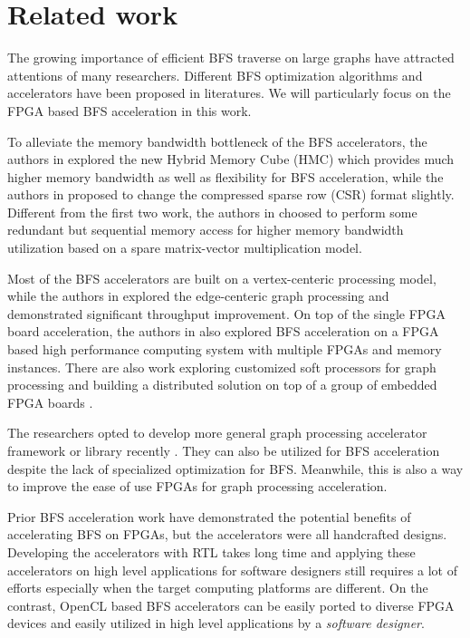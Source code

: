 \section{Related work} \label{sec:relatedwork}
The growing importance of efficient BFS traverse on large graphs 
have attracted attentions of many researchers. 
Different BFS optimization algorithms and accelerators 
have been proposed in literatures. We will 
particularly focus on the FPGA based BFS acceleration 
in this work. 

To alleviate the memory bandwidth bottleneck of the 
BFS accelerators, the authors in \cite{zhang2017boosting, khoram2018accelerating} 
explored the new Hybrid Memory Cube (HMC) which provides 
much higher memory bandwidth as well as flexibility for BFS 
acceleration, while the authors in \cite{attia2014cygraph} 
proposed to change the compressed sparse row (CSR) format slightly. 
Different from the first two work, the authors in \cite{umuroglu2015hybrid} 
choosed to perform some redundant but sequential memory access for higher memory bandwidth 
utilization based on a spare matrix-vector multiplication model.

Most of the BFS accelerators are built on a vertex-centeric 
processing model, while the authors 
in \cite{zhou2016high} explored the edge-centeric graph processing and demonstrated 
significant throughput improvement. On top of the single FPGA board acceleration, 
the authors in \cite{attia2014cygraph, betkaoui2012reconfigurable} also explored 
BFS acceleration on a FPGA based high performance computing system with multiple 
FPGAs and memory instances. There are also work exploring customized soft processors 
for graph processing and building a distributed solution on 
top of a group of embedded FPGA boards \cite{kapre2015custom, wang2010message}.

The researchers opted to develop 
more general graph processing accelerator framework or library 
recently \cite{engelhardt2016gravf, jun2018grafboost, yao2018efficient, oguntebi2016graphops, Dai2017foregraph, dai2016fpgp}. 
They can also be utilized for BFS acceleration despite the lack of 
specialized optimization for BFS. Meanwhile, this is also a way to improve 
the ease of use FPGAs for graph processing acceleration.


Prior BFS acceleration work have demonstrated the potential benefits of accelerating 
BFS on FPGAs, but the accelerators were all handcrafted designs. 
Developing the accelerators with RTL
takes long time and applying these accelerators 
on high level applications for software designers still requires a lot of 
efforts especially when the target computing platforms are different. 
On the contrast, OpenCL based BFS accelerators can be easily ported to 
diverse FPGA devices and easily utilized in high level applications 
by a \textit{software designer}.
